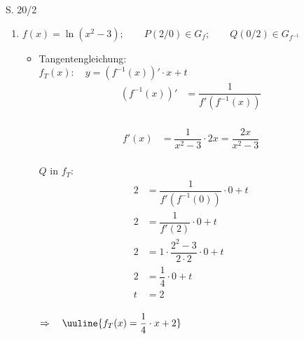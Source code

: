 \begin{Exercise}{S. 20/2}{}
\begin{enumerate}
\begin{enumerate}[label=\alph*)]
{\begin{itemize}[leftmargin=*]
{\begin{align*}
                            t &= \dfrac{5}{3} &&
                        \end{align*}\\[-2.0ex]
                        $\Rightarrow \quad \uuline{f_{T}(x) = - \dfrac{1}{3} \cdot x + \dfrac{5}{3}}$\\
                        }
                \end{itemize}
                }
            \item[b)] {
                $f(x) = \ln(x^{2} - 3); \qquad P(2/0) \in G_{f}; \qquad Q(0/2) \in G_{f^{-1}}$\\[-2.0ex]
                \begin{itemize}[leftmargin=*]
                    \item Tangentengleichung: \\[2.0ex]{
                        $f_{T}(x): \quad y = \left(f^{-1}(x)\right)' \cdot x + t$\\
                        \vspace{-2.0ex}
                        \begin{align*}
                            \left(f^{-1}(x)\right)' &= \dfrac{1}{f'\left(f^{-1}(x)\right)} &&
                        \end{align*}\\[-2.0ex]
                        \begin{align*}
                            f'(x) &= \dfrac{1}{x^{2} - 3} \cdot 2x = \dfrac{2x}{x^{2} - 3} &&
                        \end{align*}\\[-2.0ex]
                        $Q$ in $f_{T}$: \\[-2.0ex]
                        \begin{align*}
                            2 &= \dfrac{1}{f'\left(f^{-1}(0)\right)} \cdot 0 + t &&\\[1.5ex]
                            2 &= \dfrac{1}{f'(2)} \cdot 0 + t &&\\[1.5ex]
                            2 &= 1 \cdot \dfrac{2^{2} - 3}{2 \cdot 2} \cdot 0 + t &&\\[1.5ex]
                            2 &= \dfrac{1}{4} \cdot 0 + t &&\\[1.5ex]
                            t &= 2 &&
                        \end{align*}\\[-2.0ex]
                        $\Rightarrow \quad \uuline{f_{T}(x) = \dfrac{1}{4} \cdot x + 2}$\\
}
\end{itemize}}
\end{enumerate}
\end{enumerate}
\end{Exercise}
